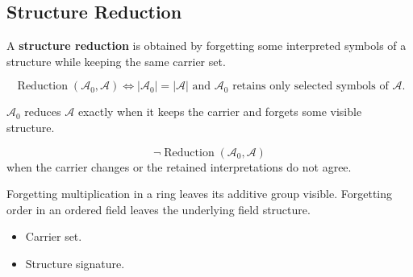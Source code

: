 \subsection{Structure Reduction}
\label{subsec:structure-reduction}

\begin{definition}
\label{def:structure-reduction}
A \textbf{structure reduction} is obtained by forgetting some interpreted
symbols of a structure while keeping the same carrier set.
\end{definition}

\begin{remark*}
\[
\operatorname{Reduction}(\mathcal{A}_0,\mathcal{A})
\Longleftrightarrow
|\mathcal{A}_0|=|\mathcal{A}|
\text{ and } \mathcal{A}_0 \text{ retains only selected symbols of }
\mathcal{A}.
\]
\end{remark*}

\begin{remark*}
$\mathcal{A}_0$ reduces $\mathcal{A}$ exactly when it keeps the carrier and
forgets some visible structure.
\end{remark*}

\begin{remark*}
\[
\neg\operatorname{Reduction}(\mathcal{A}_0,\mathcal{A})
\]
when the carrier changes or the retained interpretations do not agree.
\end{remark*}

\begin{remark*}[Interpretation]
Forgetting multiplication in a ring leaves its additive group visible.
Forgetting order in an ordered field leaves the underlying field structure.
\end{remark*}

\begin{remark*}[Dependencies]
\begin{itemize}
  \item Carrier set.
  \item Structure signature.
\end{itemize}
\end{remark*}
